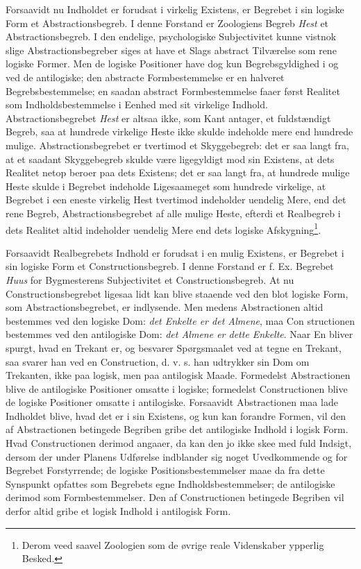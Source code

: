 \documentclass[11pt]{book}
\newcommand{\opage}[1]{\marginnote{\footnotesize\textit{[#1]}}}
\begin{document}
Forsaavidt nu Indholdet er forudsat i virkelig Existens, er Begrebet i
sin logiske Form et Abstractionsbegreb. I denne Forstand er Zoologiens
Begreb \emph{Hest} et Abstractionsbegreb. I den endelige,
psychologiske Subjectivitet kunne vistnok slige Abstractionsbegreber
siges at have et Slags abstract Tilværelse som rene logiske Former.
Men de logiske Positioner have dog kun Begrebsgyldighed i og ved de
antilogiske; den abstracte Formbestemmelse er en halveret
Begrebsbestemmelse; en saadan abstract Formbestemmelse faaer først
Realitet som Indholdsbestemmelse i Eenhed med sit virkelige Indhold.
Abstractionsbegrebet \emph{Hest} er altsaa ikke, som Kant antager, et
fuldstændigt Begreb, saa at hundrede virkelige Heste ikke skulde
indeholde mere end hundrede mulige. Abstractionsbegrebet er tvertimod
et Skyggebegreb: det er saa langt fra, at et saadant Skyggebegreb
skulde være ligegyldigt mod sin Existens, at dets Realitet netop
beroer paa dets Existens; det er saa langt fra, at hundrede mulige
Heste skulde i Begrebet indeholde Ligesaameget som hundrede virkelige,
at Begrebet i een eneste virkelig Hest tvertimod indeholder uendelig
Mere, end det rene Begreb, Abstractionsbegrebet af alle mulige Heste,
efterdi et Realbegreb i dets Realitet altid indeholder uendelig Mere
end dets logiske Afskygning\footnote{Derom veed saavel Zoologien som de
øvrige reale Videnskaber ypperlig Besked.}. %

Forsaavidt Realbegrebets Indhold er forudsat i en mulig Existens, er
Begrebet i sin logiske Form et Constructionsbegreb. I denne Forstand
er f. Ex. Begrebet \emph{Huus} for Bygmesterens Subjectivitet et
Constructionsbegreb. At nu Constructionsbegrebet ligesaa lidt kan
blive staaende ved den blot logiske Form, som Abstractionsbegrebet, er
indlysende. Men medens Abstractionen altid bestemmes ved den logiske
Dom: \emph{det Enkelte er det Almene}, maa Con\-%
\opage{164} \setcounter{footnote}{0}%
structionen bestemmes ved den antilogiske Dom: \emph{det Almene er
dette Enkelte}. Naar En bliver spurgt, hvad en Trekant er, og besvarer
Spørgsmaalet ved at tegne en Trekant, saa svarer han ved en
Construction, d. v. s. han udtrykker sin Dom om Trekanten, ikke paa
logisk, men paa antilogisk Maade. Formedelst Abstractionen blive de
antilogiske Positioner omsatte i logiske; formedelst Constructionen
blive de logiske Positioner omsatte i antilogiske. Forsaavidt
Abstractionen maa lade Indholdet blive, hvad det er i sin Existens, og
kun kan forandre Formen, vil den af Abstractionen betingede Begriben
gribe det antilogiske Indhold i logisk Form. Hvad Constructionen
derimod angaaer, da kan den jo ikke skee med fuld Indsigt, dersom der
under Planens Udførelse indblander sig noget Uvedkommende og for
Begrebet Forstyrrende; de logiske Positionsbestemmelser maae da fra
dette Synspunkt opfattes som Begrebets egne Indholdsbestemmelser; de
antilogiske derimod som Formbestemmelser. Den af Constructionen
betingede Begriben vil derfor altid gribe et logisk Indhold i
antilogisk Form.
\end{document}
